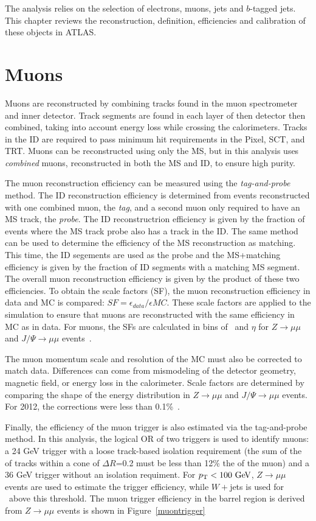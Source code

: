 
The analysis relies on the selection of electrons, muons, jets and $b$-tagged jets. This chapter reviews the reconstruction, definition, efficiencies and calibration of these objects in ATLAS.

\section{Muons}
Muons are reconstructed by combining tracks found in the muon spectrometer and inner detector. Track segments are found in each layer of then detector then combined, taking into account energy loss while crossing the calorimeters. Tracks in the ID are required to pass minimum hit requirements in the Pixel, SCT, and TRT. Muons can be reconstructed using only the MS, but in this analysis uses \emph{combined} muons, reconstructed in both the MS and ID, to ensure high purity.

The muon reconstruction efficiency can be measured using the \emph{tag-and-probe} method. The ID reconstruction efficiency is determined from events reconstructed with one combined muon, the \emph{tag}, and a second muon only required to have an MS track, the \emph{probe}. The ID reconstructrion efficiency is given by the fraction of events where the MS track probe also has a track in the ID. The same method can be used to determine the efficiency of the MS reconstruction as matching. This time, the ID segements are used as the probe and the MS+matching efficiency is given by the fraction of ID segments with a matching MS segment. The overall muon reconstruction efficiency is given by the product of these two efficiencies. To obtain the scale factors (SF), the muon reconstruction efficiency in data and MC is compared: $SF = \epsilon_{data}/\epsilon{MC}$. These scale factors are applied to the simulation to ensure that muons are reconstructed with the same efficiency in MC as in data. For muons, the SFs are calculated in bins of \pt\ and $\eta$ for $Z\rightarrow \mu\mu$ and $J/\Psi\rightarrow \mu\mu$ events~\cite{muonpaper}. 

The muon momentum scale and resolution of the MC must also be corrected to match data. Differences can come from mismodeling of the detector geometry, magnetic field, or energy loss in the calorimeter. Scale factors are determined by comparing the shape of the energy distribution in $Z\rightarrow \mu\mu$ and $J/\Psi\rightarrow \mu\mu$ events. For 2012, the corrections were less than 0.1\%~\cite{muonpaper}.

Finally, the efficiency of the muon trigger is also estimated via the tag-and-probe method. In this analysis, the logical OR of two triggers is used to identify muons: a 24 GeV trigger with a loose track-based isolation requirement (the sum of the \pt of tracks within a cone of $\Delta R$=0.2 must be less than 12\% the \pt of the muon) and a 36 GeV trigger without an isolation requiment. For $\pt<100 \gev$, $Z\rightarrow\mu\mu$ events are used to estimate the trigger efficiency, while $W+$jets is used for \pt\ above this threshold. The muon trigger efficiency in the barrel region is derived from $Z\rightarrow\mu\mu$ events is shown in Figure~\ref{muontrigger}

